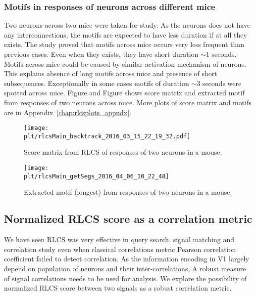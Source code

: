 \documentclass[MTech]{iitmdiss}
\newcommand{\plt}{thesis_plots}
\begin{document}
\subsubsection{Motifs in responses of neurons across different mice} %
\label{ssub:motifs_in_responses_of_neurons_across_different_mice}
Two neurons across two mice were taken for study. As the neurons does not have any interconnections, the motifs are expected to have less duration if at all they exists. The study proved that motifs across mice occurs very less frequent than previous cases. Even when they exists, they have short duration $\sim 1$ seconds. Motifs across mice could be caused by similar activation mechanism of neurons. This explains absence of long motifs across mice and presence of short subsequences. Exceptionally in some cases motifs of duration $\sim 3$ seconds were spotted across mice. Figure and Figure shows score matrix and extracted motif from responses of two neurons across mice. More plots of score matrix and motifs are in Appendix~\ref{chap:rlcsplots_appndx}.
\begin{figure}
    \centering
    \texttt{[image: \\plt/rlcsMain\_backtrack\_2016\_03\_15\_22\_19\_32.pdf]}
    \caption{Score matrix from RLCS of responses of two neurons in a mouse.}
    \label{img:score_neuron}
\end{figure}
\begin{figure}
    \centering
    \texttt{[image: \\plt/rlcsMain\_getSegs\_2016\_04\_06\_10\_22\_48]}
    \caption{Extracted motif (longest) from responses of two neurons in a mouse.}
    \label{img:motif_neuron}
\end{figure}
\subsection{Normalized RLCS score as a correlation metric} %
\label{sub:normalized_rlcs_score_as_a_correlation_metric}
We have seen RLCS was very effective in query search, signal matching and correlation study even when classical correlations metric Pearson correlation coefficient failed to detect correlation. As the information encoding in V1 largely depend on population of neurons and their inter-correlations, A robust measure of signal correlations needs to be used for analysis. We explore the possibility of normalized RLCS score between two signals as a robust correlation metric.
\end{document}
